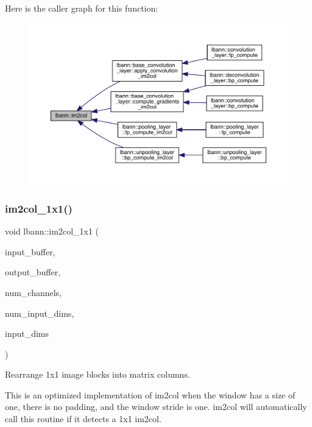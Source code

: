 Here is the caller graph for this function\+:\nopagebreak
\begin{figure}[H]
\begin{center}
\leavevmode
\includegraphics[width=350pt]{namespacelbann_aa3636a1979e40da2af91f30a12b90db9_icgraph}
\end{center}
\end{figure}
\mbox{\label{namespacelbann_a3d099edd7d1b09889e0d2133bb83d5bf}} 
\subsubsection{\texorpdfstring{im2col\+\_\+1x1()}{im2col\_1x1()}}
{\footnotesize\ttfamily void lbann\+::im2col\+\_\+1x1 (\begin{DoxyParamCaption}\item[{const Data\+Type $\ast$}]{input\+\_\+buffer,  }\item[{Data\+Type $\ast$}]{output\+\_\+buffer,  }\item[{int}]{num\+\_\+channels,  }\item[{int}]{num\+\_\+input\+\_\+dims,  }\item[{const int $\ast$}]{input\+\_\+dims }\end{DoxyParamCaption})}



Rearrange 1x1 image blocks into matrix columns. 

This is an optimized implementation of im2col when the window has a size of one, there is no padding, and the window stride is one. im2col will automatically call this routine if it detects a 1x1 im2col. 


